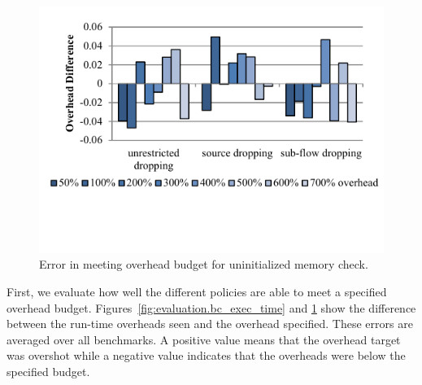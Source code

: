 \begin{figure}
  \begin{center}
    \includegraphics[width=\columnwidth]{figs/data_umc_exec_time.pdf}
    \vspace{-0.2in}
    \caption{Error in meeting overhead budget for uninitialized memory check.}
    \label{fig:evaluation.umc_exec_time}
    \vspace{-0.2in}
  \end{center}
\end{figure}

First, we evaluate how well the different policies are able to meet a specified
overhead budget. Figures~\ref{fig:evaluation.bc_exec_time} and
\ref{fig:evaluation.umc_exec_time} show the difference between the run-time
overheads seen and the overhead specified. These errors are averaged over all
benchmarks. A positive value means that the
overhead target was overshot while a negative value indicates that the
overheads were below the specified budget.

